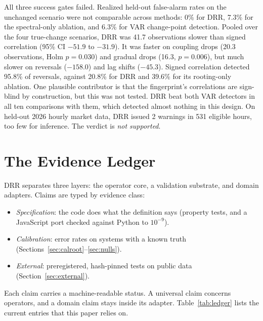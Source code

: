 \documentclass[10pt,twocolumn,letterpaper]{article}
\theoremstyle{definition}
\theoremstyle{remark}
\begin{document}
All three success gates failed. Realized held-out false-alarm rates on the
unchanged scenario were not comparable across methods: 0\% for DRR, 7.3\% for
the spectral-only ablation, and 6.3\% for VAR change-point detection. Pooled
over the four true-change scenarios, DRR was 41.7 observations slower than
signed correlation (95\% CI $-51.9$ to $-31.9$). It was faster on coupling drops
(20.3 observations, Holm $p=0.030$) and gradual drops (16.3, $p=0.006$), but much
slower on reversals ($-158.0$) and lag shifts ($-45.3$). Signed correlation
detected 95.8\% of reversals, against 20.8\% for DRR and 39.6\% for its
rooting-only ablation. One plausible contributor is that the fingerprint's
correlations are sign-blind by construction, but this was not tested. DRR beat
both VAR detectors in all ten comparisons with them, which detected almost
nothing in this design. On held-out 2026 hourly market data, DRR issued 2
warnings in 531 eligible hours, too few for inference. The verdict is
\emph{not supported}.

\section{The Evidence Ledger}\label{sec:ledger}

DRR separates three layers: the operator core, a validation substrate, and
domain adapters. Claims are typed by evidence class:
\begin{itemize}
\item \emph{Specification}: the code does what the definition says (property
tests, and a JavaScript port checked against Python to $10^{-9}$).
\item \emph{Calibration}: error rates on systems with a known truth
(Sections~\ref{sec:calroot}--\ref{sec:nulls}).
\item \emph{External}: preregistered, hash-pinned tests on public data
(Section~\ref{sec:external}).
\end{itemize}
Each claim carries a machine-readable status. A universal claim concerns
operators, and a domain claim stays inside its adapter. Table~\ref{tab:ledger}
lists the current entries that this paper relies on.
\end{document}
